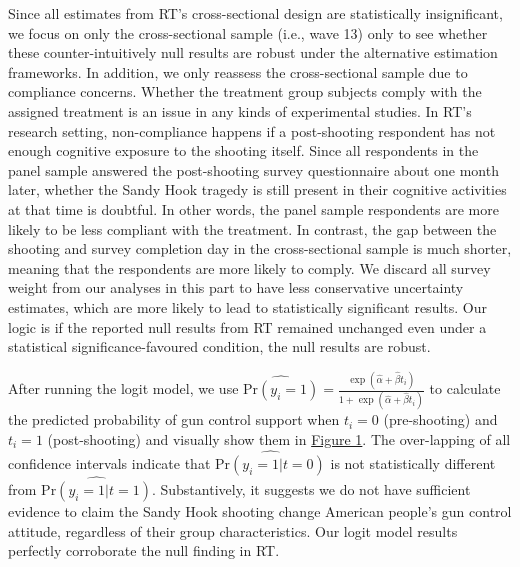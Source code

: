 \documentclass[11pt]{article}
\begin{document}
Since all estimates from RT’s cross-sectional design are statistically insignificant, we focus on only the cross-sectional sample (i.e., wave 13) only to see whether these counter-intuitively null results are robust under the alternative estimation frameworks. In addition, we only reassess the cross-sectional sample due to compliance concerns. Whether the treatment group subjects comply with the assigned treatment is an issue in any kinds of experimental studies. In RT’s research setting, non-compliance happens if a post-shooting respondent has not enough cognitive exposure to the shooting itself. Since all respondents in the panel sample answered the post-shooting survey questionnaire about one month later, whether the Sandy Hook tragedy is still present in their cognitive activities at that time is doubtful. In other words, the panel sample respondents are more likely to be less compliant with the treatment. In contrast, the gap between the shooting and survey completion day in the cross-sectional sample is much shorter, meaning that the respondents are more likely to comply. We discard all survey weight from our analyses in this part to have less conservative uncertainty estimates, which are more likely to lead to statistically significant results. Our logic is if the reported null results from RT remained unchanged even under a statistical significance-favoured condition, the null results are robust.

After running the logit model, we use \(\displaystyle{\widehat{{\text{Pr}(y_i = 1)}} = \frac{\exp(\hat{\alpha} + \hat{\beta} t_{i})}{1 + \exp(\hat{\alpha} + \hat{\beta} t_{i})}}\) to calculate the predicted probability of gun control support when \(t_i = 0\) (pre-shooting) and \(t_i = 1\) (post-shooting) and visually show them in \hyperref[fig1]{Figure 1}. The over-lapping of all confidence intervals indicate that \(\widehat{\text{Pr}(y_i = 1|t = 0)}\) is not statistically different from \(\widehat{\text{Pr}(y_i = 1|t = 1)}\). Substantively, it suggests we do not have sufficient evidence to claim the Sandy Hook shooting change American people’s gun control attitude, regardless of their group characteristics. Our logit model results perfectly corroborate the null finding in RT.
\end{document}
